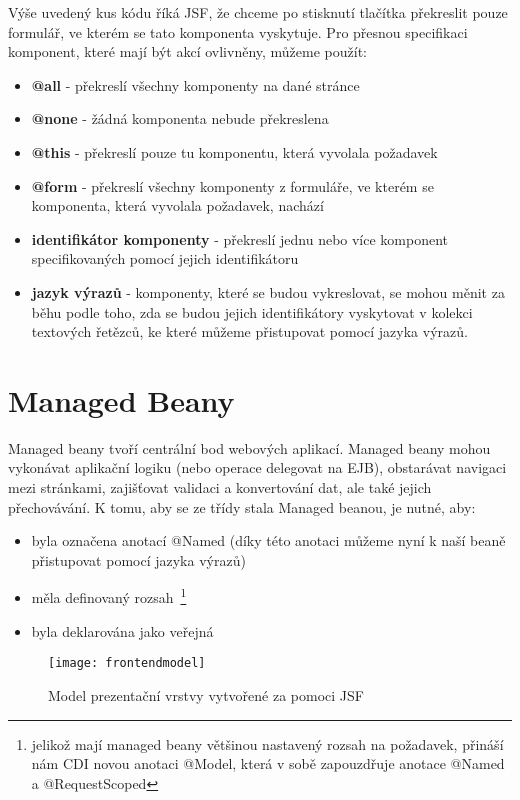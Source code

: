 \documentclass[122pt,oneside]{fithesis}
\begin{document}
Výše uvedený kus kódu říká JSF, že chceme po stisknutí tlačítka překreslit pouze formulář, ve kterém se tato komponenta vyskytuje. Pro přesnou specifikaci komponent, které mají být akcí ovlivněny, můžeme použít:
\begin{itemize}
  \item {\bf @all} - překreslí všechny komponenty na dané stránce 
  \item {\bf @none} - žádná komponenta nebude překreslena
  \item {\bf @this} - překreslí pouze tu komponentu, která vyvolala požadavek
  \item {\bf @form} - překreslí všechny komponenty z formuláře, ve kterém se komponenta, která vyvolala požadavek, nachází
  \item {\bf identifikátor komponenty} - překreslí jednu nebo více komponent specifikovaných pomocí jejich identifikátoru
  \item {\bf jazyk výrazů} - komponenty, které se budou vykreslovat, se mohou měnit za běhu podle toho, zda se budou jejich identifikátory vyskytovat v kolekci textových řetězců, ke které můžeme přistupovat pomocí jazyka výrazů.
\end{itemize}

\section{Managed Beany} 
Managed beany tvoří centrální bod webových aplikací. Managed beany mohou vykonávat aplikační logiku (nebo operace delegovat na EJB), obstarávat navigaci mezi stránkami, zajišťovat validaci a konvertování dat, ale také jejich přechovávání. K tomu, aby se ze třídy stala Managed beanou, je nutné, aby:
\begin{itemize}
  \item byla označena anotací @Named (díky této anotaci můžeme nyní k naší beaně přistupovat pomocí jazyka výrazů)
  \item měla definovaný rozsah~\footnote{jelikož mají managed beany většinou nastavený rozsah na požadavek, přináší nám CDI novou anotaci @Model, která v sobě zapouzdřuje anotace @Named a @RequestScoped}
  \item byla deklarována jako veřejná
\end{itemize}

\begin{figure}[!ht]
\centering
\texttt{[image: frontendmodel]}
\caption{Model prezentační vrstvy vytvořené za pomoci JSF}
\label{img:frontend}
\end{figure}
\end{document}
